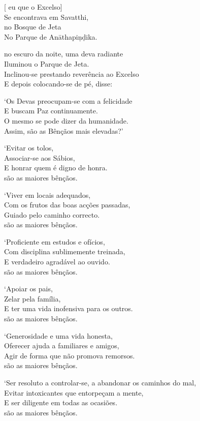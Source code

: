 [ eu  que o Excelso]\\
Se encontrava em Savatthi,\\
 no Bosque de Jeta\\
No Parque de Anāthapiṇḍika.

 no escuro da noite, uma deva radiante\\
Iluminou  o Parque de Jeta.\\
Inclinou-se prestando reverência ao Excelso\\
E depois colocando-se de pé, disse:

`Os Devas preocupam-se com a felicidade\\
E buscam Paz continuamente.\\
O mesmo se pode dizer da humanidade.\\
Assim,  são as Bênçãos mais elevadas?'

`Evitar os tolos,\\
Associar-se aos Sábios,\\
E honrar quem é digno de honra.\\
 são as maiores bênçãos.

`Viver em locais adequados,\\
Com os frutos das boas acções passadas,\\
Guiado pelo caminho correcto.\\
 são as maiores bênçãos.

\clearpage

`Proficiente em estudos e ofícios,\\
Com disciplina sublimemente treinada,\\
E  verdadeiro agradável ao ouvido.\\
 são as maiores bênçãos.

`Apoiar os pais,\\
Zelar pela família,\\
E ter uma vida inofensiva para os outros.\\
 são as maiores bênçãos.

`Generosidade e uma vida honesta,\\
Oferecer ajuda a familiares e amigos,\\
Agir de forma que não promova remorsos.\\
 são as maiores bênçãos.

`Ser resoluto a controlar-se, a abandonar os caminhos do mal,\\
Evitar intoxicantes que entorpeçam a mente,\\
E ser diligente em todas as ocasiões.\\
 são as maiores bênçãos.

